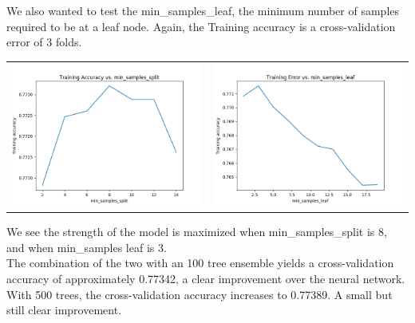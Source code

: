 \begin{itemize}
\begin{itemize}
\begin{itemize}
                We also wanted to test the min_samples_leaf, the minimum number of
                samples required to be at a leaf node. Again, the Training
                accuracy is a cross-validation error of 3 folds.
                \begin{center}
                    \begin{tabular}{ c c }
                    \includegraphics[width=20em]{figure_3.png} &
                    \includegraphics[width=20em]{figure_4.png}
                    \end{tabular}
                \end{center}
                We see the strength of the model is maximized when
                min_samples_split is 8, and when min_samples leaf is 3.\\

                The combination of the two with an 100 tree ensemble yields a
                cross-validation accuracy of approximately 0.77342, a clear
                improvement over the neural network. With 500 trees, the
                cross-validation accuracy increases to 0.77389. A small but
                still clear improvement.

            \pagebreak


\end{itemize}
\end{itemize}
\end{itemize}

